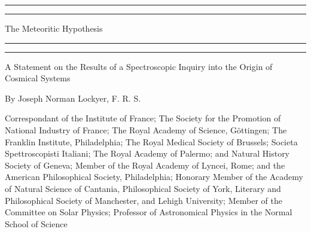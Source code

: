\documentclass[a4paper, 12pt, oneside, polutonikogreek, english]{article}
\begin{document}
\begin{titlepage} %
	\centering %
	\scshape %

	
	\rule{\textwidth}{1.6pt}\vspace*{-\baselineskip}\vspace*{2pt} %
	\rule{\textwidth}{0.4pt} %
	
	\vspace{0.75\baselineskip} %
	
	{\Huge The Meteoritic Hypothesis} %
	
	\vspace{0.75\baselineskip} %
	
	\rule{\textwidth}{0.4pt}\vspace*{-\baselineskip}\vspace{3.2pt} %
	\rule{\textwidth}{1.6pt} %
	
	\vspace{1\baselineskip} %
	
	
	{A Statement on the Results of a Spectroscopic Inquiry into the Origin of Cosmical Systems} %
	
	\vspace*{1\baselineskip} %
	

        {By Joseph Norman Lockyer, F. R. S.}
 
	\vspace{1\baselineskip} %

        {\scriptsize Correspondant of the Institute of France; The Society for the Promotion of National Industry of France; The Royal Academy of Science, Göttingen; The Franklin Institute, Philadelphia; The Royal Medical Society of Brussels; Societa Spettroscopisti Italiani; The Royal Academy of Palermo; and Natural History Society of Geneva; Member of the Royal Academy of Lyncei, Rome; and the American Philosophical Society, Philadelphia; Honorary Member of the Academy of Natural Science of Cantania, Philosophical Society of York, Literary and Philosophical Society of Manchester, and Lehigh University; Member of the Committee on Solar Physics; Professor of Astronomical Physics in the Normal School of Science}
        

\end{titlepage}
\end{document}

